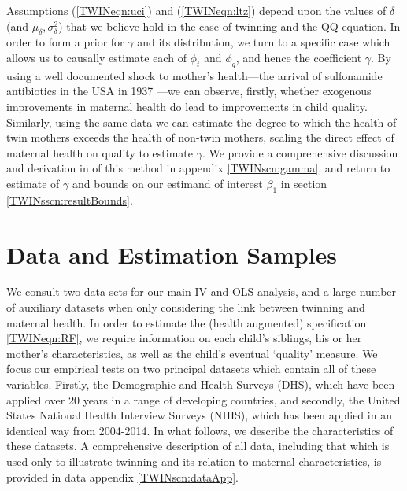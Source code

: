 Assumptions (\ref{TWINeqn:uci}) and (\ref{TWINeqn:ltz}) depend upon the values
of $\delta$ (and $\mu_\delta,\sigma^2_\delta$) that we believe hold in the case 
of twinning and the QQ equation.  In order to form a prior for $\gamma$ and its
distribution, we turn to a specific case which allows us to causally estimate 
each of $\phi_t$ and $\phi_q$, and hence the coefficient $\gamma$.  By using a 
well documented shock to mother's health---the arrival of sulfonamide antibiotics 
in the USA in 1937 \citep{BhalotraVenkataramani2014,Jayachandranetal2010}---we 
can observe, firstly, whether exogenous improvements in maternal health do lead
to improvements in child quality.  Similarly, using the same data we can estimate
the degree to which the health of twin mothers exceeds the health of non-twin 
mothers, scaling the direct effect of maternal health on quality to estimate 
$\gamma$.  We provide a comprehensive discussion and derivation in of this method 
in appendix \ref{TWINscn:gamma}, and return to estimate of $\gamma$ and bounds on 
our estimand of interest $\beta_1$ in section \ref{TWINsscn:resultBounds}.


\section{Data and Estimation Samples}              \label{TWINscn:data}
We consult two data sets for our main IV and OLS analysis, and a large number of
auxiliary datasets when only considering the link between twinning and maternal
health.  In order to estimate the (health augmented) specification 
\ref{TWINeqn:RF}, we require information on each child's siblings, his or her
mother's characteristics, as well as the child's eventual `quality' measure. 
We focus our empirical tests on two principal datasets which contain all of 
these variables.  Firstly, the Demographic and Health Surveys (DHS), which have 
been applied over 20 years in a range of developing countries, and secondly, the 
United States National Health Interview Surveys (NHIS), which has been applied 
in an identical way from 2004-2014.  In what follows, we describe the 
characteristics of these datasets.  A comprehensive description of all data, 
including that which is used only to illustrate twinning and its relation to 
maternal characteristics, is provided in data appendix \ref{TWINscn:dataApp}.


